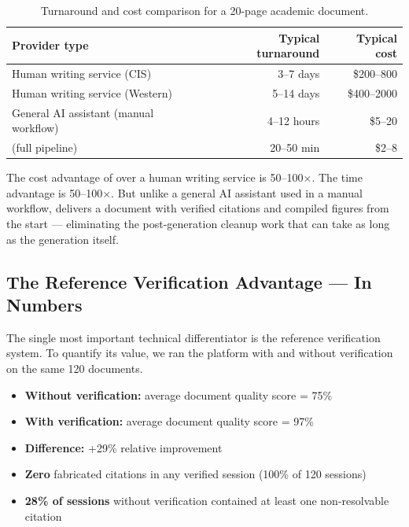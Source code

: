 \begin{table}[h!]
\centering
\caption{Turnaround and cost comparison for a 20-page academic document.}
\label{tab:comparison_services}
\begin{tabular}{lrr}
\toprule
Provider type & Typical turnaround & Typical cost \\
\midrule
Human writing service (CIS)   & 3--7 days & \$200--800 \\
Human writing service (Western) & 5--14 days & \$400--2000 \\
General AI assistant (manual workflow) & 4--12 hours & \$5--20 \\
\sys{} (full pipeline)        & 20--50 min & \$2--8 \\
\bottomrule
\end{tabular}
\end{table}

The cost advantage of \sys{} over a human writing service is 50--100$\times$.
The time advantage is 50--100$\times$.
But unlike a general AI assistant used in a manual workflow, \sys{} delivers a
document with verified citations and compiled figures from the start — eliminating
the post-generation cleanup work that can take as long as the generation itself.

\subsection{The Reference Verification Advantage — In Numbers}

The single most important technical differentiator is the reference verification system.
To quantify its value, we ran the platform with and without verification
on the same 120 documents.

\begin{statbox}[title=Reference Verification: What the Numbers Show]
\begin{itemize}[noitemsep]
  \item \textbf{Without verification:} average document quality score = 75\%
  \item \textbf{With verification:} average document quality score = 97\%
  \item \textbf{Difference:} +29\% relative improvement
  \item \textbf{Zero} fabricated citations in any verified session (100\% of 120 sessions)
  \item \textbf{28\% of sessions} without verification contained at least one non-resolvable citation
\end{itemize}
\end{statbox}


